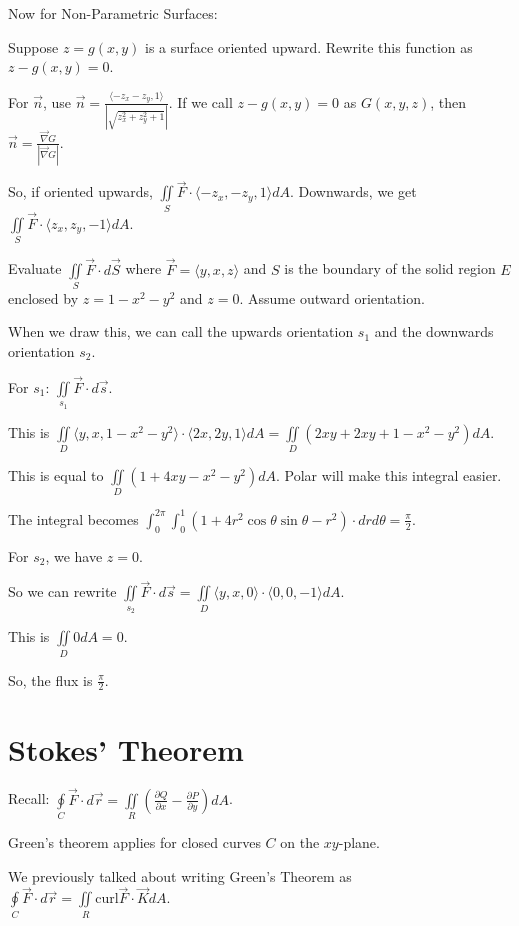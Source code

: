 \documentclass[../calc3.tex]{subfiles}
\begin{document}
Now for Non-Parametric Surfaces:

Suppose $z=g(x,y)$ is a surface oriented upward. Rewrite this function as $z-g(x,y)=0$.

For $\vec{n}$, use $\vec{n}=\frac{\langle -z_x-z_y,1\rangle}{|\sqrt{z_x^2+z_y^2+1} |}$. If we call $z-g(x,y)=0$ as $G(x,y,z)$, then $\vec{n}=\frac{\vec{\nabla}G}{|\vec{\nabla}G |}$.

So, if oriented upwards, $\iint\limits_{S}\vec{F}\cdot \langle -z_x,-z_y,1\rangle dA$. Downwards, we get $\iint\limits_{S}\vec{F}\cdot \langle z_x,z_y,-1\rangle dA$.

\pagebreak
\begin{example}
    Evaluate $\iint\limits_{S}\vec{F}\cdot d\vec{S}$ where $\vec{F}=\langle y,x,z\rangle$ and $S$ is the boundary of the solid region $E$ enclosed by $z=1-x^2-y^2$ and $z=0$. Assume outward orientation.

    When we draw this, we can call the upwards orientation $s_1$ and the downwards orientation $s_2$.

    For $s_1$: $\iint\limits_{s_1}\vec{F}\cdot d\vec{s}$.

    This is $\iint\limits_{D}\langle y,x,1-x^2-y^2\rangle\cdot \langle 2x,2y,1\rangle dA = \iint\limits_{D}(2xy+2xy+1-x^2-y^2)dA$.

    This is equal to $\iint\limits_{D}(1+4xy-x^2-y^2)dA$. Polar will make this integral easier.

    The integral becomes $\int_0^{2\pi}\int_0^1 (1+4r^2\cos\theta\sin\theta-r^2)\cdot dr d\theta = \frac{\pi}{2}$.

    For $s_2$, we have $z=0$.

    So we can rewrite $\iint\limits_{s_2}\vec{F}\cdot d\vec{s}=\iint\limits_{D}\langle y,x,0\rangle\cdot \langle 0,0,-1\rangle dA$.

    This is $\iint\limits_{D}0dA =0 $.

    So, the flux is $\frac{\pi}{2}$.
\end{example}

\section{Stokes' Theorem}
Recall: $\oint\limits_{C}\vec{F}\cdot d\vec{r}=\iint\limits_{R}\left(\frac{\partial Q}{\partial x}-\frac{\partial P}{\partial y}\right)dA$. 

Green's theorem applies for closed curves $C$ on the $xy$-plane.

We previously talked about writing Green's Theorem as $\oint\limits_{C}\vec{F}\cdot d\vec{r}=\iint\limits_{R}\text{curl}\vec{F}\cdot \vec{K}dA$.
\end{document}
